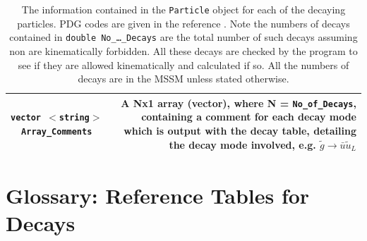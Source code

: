 \documentclass[final,3p,times,pdflatex]{elsarticle}
\begin{document}
\begin{center}
\begin{table}
\begin{tabular}{|C|D|}
{\tt vector $<$string$>$ Array{\_}Comments} & A Nx1 array (vector), where N = {\tt No{\_}of{\_}Decays}, containing a comment for each decay mode which is output with the decay table, detailing the decay mode involved, e.g. $\tilde{g} \rightarrow \bar{u} \tilde{u}_L$ \\ \hline
\end{tabular}
\caption{The information contained in the {\tt Particle} object for each of
  the decaying particles. PDG codes are given in the reference
  \cite{Allanach:2008qq}. Note the numbers of decays contained in {\tt double
    No{\_}\ldots{\_}Decays} are the total number of such decays assuming non are
  kinematically forbidden. All these decays are checked by the program to see
  if they are allowed kinematically and calculated if so. All the numbers of
  decays are in the MSSM unless stated otherwise.} 
\label{particleclass}
\end{table}
\end{center}

\section{Glossary: Reference Tables for Decays\label{appendix:exp}} 
\end{document}
